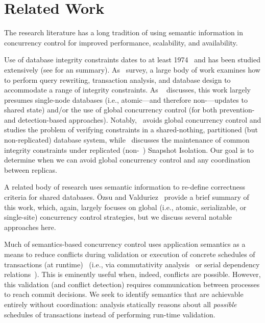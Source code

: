 
\section{Related Work}
\label{sec:relatedwork}

The research literature has a long tradition of using semantic
information in concurrency control for improved performance,
scalability, and availability.


 Use of database integrity constraints
dates to at least 1974~\cite{florentin-constraints} and has been
studied extensively (see \cite{tamer-book} for an
summary). As~\cite{ic-survey,ic-survey-two} survey, a large body of
work examines how to perform query rewriting, transaction analysis,
and database design to accommodate a range of integrity
constraints. As ~\cite{tamer-book} discusses, this work largely
presumes single-node databases (i.e., atomic---and therefore
non-\cfree---updates to shared state) and/or the use of global
concurrency control (for both prevention- and detection-based
approaches). Notably,~\cite{local-verification} avoids global
concurrency control and studies the problem of verifying constraints
in a shared-nothing, partitioned (but non-replicated) database system,
while~\cite{kemme-si-ic} discusses the maintenance of common integrity
constraints under replicated (non-\cfree~\cite{hat-vldb}) Snapshot
Isolation. Our goal is to determine when we can avoid global
concurrency control and any coordination between replicas.


 A related body of
research uses semantic information to re-define correctness criteria
for shared databases. \"{O}zsu and Valduriez~\cite{tamer-book} provide
a brief summary of this work, which, again, largely focuses on global
(i.e., atomic, serializable, or single-site) concurrency control
strategies, but we discuss several notable approaches here.

Much of semantics-based concurrency control uses application semantics
as a means to reduce conflicts during validation or execution of
concrete schedules of transactions (at
runtime)~\cite{badrinath-semantics} (i.e., via commutativity
analysis~\cite{weihl-thesis} or serial dependency
relations~\cite{herlihy-apologizing}). This is eminently useful when,
indeed, conflicts are possible. However, this validation (and conflict
detection) requires communication between processes to reach commit
decisions. We seek to identify semantics that are achievable entirely
without coordination: \iconfluence analysis statically reasons about
all \textit{possible} schedules of transactions instead of performing
run-time validation.

